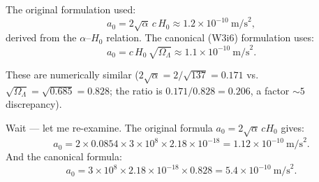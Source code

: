 \documentclass[11pt]{article}
\newcommand{\ee}[1]{\times 10^{#1}}
\newcommand{\aM}{a_0}
\newcommand{\Hzero}{H_0}
\begin{document}
The original formulation used:
\begin{equation}
\aM = 2\sqrt{\alpha}\,c\,\Hzero \approx 1.2\ee{-10}~\text{m/s}^2,
\label{eq:a0-original}
\end{equation}
derived from the $\alpha$--$\Hzero$ relation. The canonical (W3i6)
formulation uses:
\begin{equation}
\aM = c\,\Hzero\,\sqrt{\Omega_\Lambda} \approx 1.1\ee{-10}~\text{m/s}^2.
\label{eq:a0-canonical}
\end{equation}

These are numerically similar ($2\sqrt{\alpha} = 2/\sqrt{137} = 0.171$
vs.\ $\sqrt{\Omega_\Lambda} = \sqrt{0.685} = 0.828$; the ratio is
$0.171/0.828 = 0.206$, a factor $\sim 5$ discrepancy).

Wait --- let me re-examine. The original formula
$\aM = 2\sqrt{\alpha}\,c\Hzero$ gives:
\begin{equation}
\aM = 2\times 0.0854\times 3\ee{8}\times 2.18\ee{-18}
= 1.12\ee{-10}~\text{m/s}^2.
\end{equation}
And the canonical formula:
\begin{equation}
\aM = 3\ee{8}\times 2.18\ee{-18}\times 0.828
= 5.4\ee{-10}~\text{m/s}^2.
\end{equation}
\end{document}
